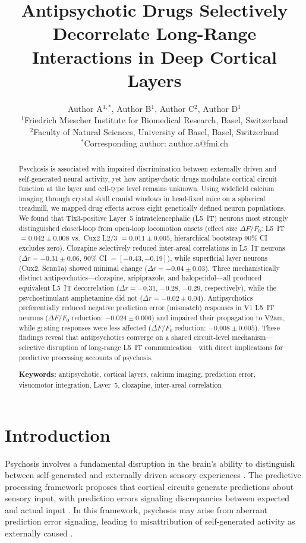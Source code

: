 \documentclass[11pt]{article}
\title{Antipsychotic Drugs Selectively Decorrelate Long-Range Interactions in Deep Cortical Layers}
\author{%
  Author A$^{1,*}$, Author B$^{1}$, Author C$^{2}$, Author D$^{1}$ \\[6pt]
  $^{1}$Friedrich Miescher Institute for Biomedical Research, Basel, Switzerland \\
  $^{2}$Faculty of Natural Sciences, University of Basel, Basel, Switzerland \\
  $^{*}$Corresponding author: author.a@fmi.ch
}
\date{}
\begin{document}
\maketitle

\begin{abstract}
Psychosis is associated with impaired discrimination between externally driven and self-generated neural activity, yet how antipsychotic drugs modulate cortical circuit function at the layer and cell-type level remains unknown. Using widefield calcium imaging through crystal skull cranial windows in head-fixed mice on a spherical treadmill, we mapped drug effects across eight genetically defined neuron populations. We found that Tlx3-positive Layer~5 intratelencephalic (L5~IT) neurons most strongly distinguished closed-loop from open-loop locomotion onsets (effect size $\Delta F/F_0$: L5~IT $= 0.042 \pm 0.008$ vs.\ Cux2 L2/3 $= 0.011 \pm 0.005$, hierarchical bootstrap 90\% CI excludes zero). Clozapine selectively reduced inter-areal correlations in L5~IT neurons ($\Delta r = -0.31 \pm 0.06$, 90\% CI $= [-0.43, -0.19]$), while superficial layer neurons (Cux2, Scnn1a) showed minimal change ($\Delta r = -0.04 \pm 0.03$). Three mechanistically distinct antipsychotics---clozapine, aripiprazole, and haloperidol---all produced equivalent L5~IT decorrelation ($\Delta r = -0.31$, $-0.28$, $-0.29$, respectively), while the psychostimulant amphetamine did not ($\Delta r = -0.02 \pm 0.04$). Antipsychotics preferentially reduced negative prediction error (mismatch) responses in V1 L5~IT neurons ($\Delta F/F_0$ reduction: $-0.024 \pm 0.006$) and impaired their propagation to V2am, while grating responses were less affected ($\Delta F/F_0$ reduction: $-0.008 \pm 0.005$). These findings reveal that antipsychotics converge on a shared circuit-level mechanism---selective disruption of long-range L5~IT communication---with direct implications for predictive processing accounts of psychosis.

\medskip
\noindent\textbf{Keywords:} antipsychotic, cortical layers, calcium imaging, prediction error, visuomotor integration, Layer~5, clozapine, inter-areal correlation
\end{abstract}

\section{Introduction}

Psychosis involves a fundamental disruption in the brain's ability to distinguish between self-generated and externally driven sensory experiences \citep{kapur2003psychosis, fletcher2009perceiving}. The predictive processing framework proposes that cortical circuits generate predictions about sensory input, with prediction errors signaling discrepancies between expected and actual input \citep{rao1999predictive, keller2018predictive}. In this framework, psychosis may arise from aberrant prediction error signaling, leading to misattribution of self-generated activity as externally caused \citep{adams2013computational, sterzer2018predictive}.
\end{document}
